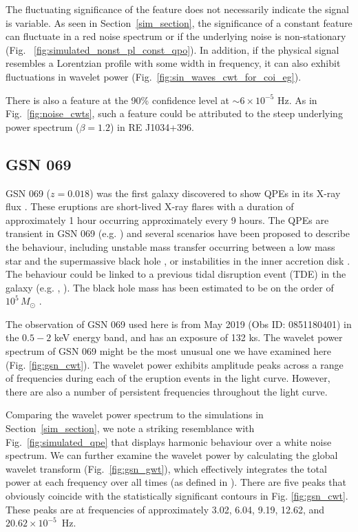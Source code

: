 \documentclass[fleqn,usenatbib]{mnras}
\begin{document}
The fluctuating significance of the feature does not necessarily indicate the signal is variable.  As seen in Section~\ref{sim_section}, the significance of a constant feature can fluctuate in a red noise spectrum or if the underlying noise is non-stationary (Fig.~ \ref{fig:simulated_nonst_pl_const_qpo}).  In addition, if the physical signal resembles a Lorentzian profile with some width in frequency, it can also exhibit fluctuations in wavelet power (Fig.~\ref{fig:sin_waves_cwt_for_coi_eg}). 

There is also a feature at the 90\% confidence level at $\sim 
6 \times 10^{-5}$ Hz.  As in Fig.~\ref{fig:noise_cwts}, such a feature could be attributed to the steep underlying power spectrum ($\beta = 1.2$) in RE  J1034+396.

\subsection{GSN 069}


GSN 069 ($z = 0.018$) was the first galaxy discovered to show QPEs in its X-ray flux \citep{miniutti2019nine_gsn}. These eruptions are short-lived X-ray flares with a duration of approximately 1 hour occurring approximately every 9 hours. The QPEs are transient in GSN 069 (e.g. \citealt{miniutti2023_gsn}) and several scenarios have been proposed to describe the behaviour, including unstable mass transfer occurring between a low mass star and the supermassive black hole \citep{lu2022_gsn_qpe_unstable_mass_transfer}, or instabilities in the inner accretion disk \citep{pan2022_gsn069_disk}.   The behaviour could be linked to a previous tidal disruption event (TDE) in the galaxy (e.g. \citealt{miniutti2019nine_gsn}, \citealt{miniutti2023_gsn}).  The black hole mass has been estimated to be on the order of $10^5 \, M_{\odot}$ \citep{miniutti2023_gsn}. 

The observation of GSN 069 used here is from May 2019 (Obs ID: 0851180401) in the $0.5 - 2$ keV energy band, and has an exposure of 132 ks.  The wavelet power spectrum of  GSN 069 might be the most unusual one we have examined here (Fig. \ref{fig:gsn_cwt}).  The wavelet power exhibits amplitude peaks across a range of frequencies during each of the eruption events in the light curve. However, there are also a number of persistent frequencies throughout the light curve.   

Comparing the wavelet power spectrum to the simulations in Section~\ref{sim_section}, we note a striking resemblance with Fig.~\ref{fig:simulated_qpe} that displays harmonic behaviour over a white noise spectrum.  We can further examine the wavelet power by calculating the global wavelet transform (Fig.~\ref{fig:gsn_gwt}), which effectively integrates the total power at each frequency over all times (as defined in \citealt{torrence1998}).  There are five peaks that obviously coincide with the statistically significant contours in Fig. \ref{fig:gsn_cwt}.  These peaks are at frequencies of approximately 3.02, 6.04, 9.19, 12.62, and $20.62\times10^{-5}$~Hz.  
\end{document}

